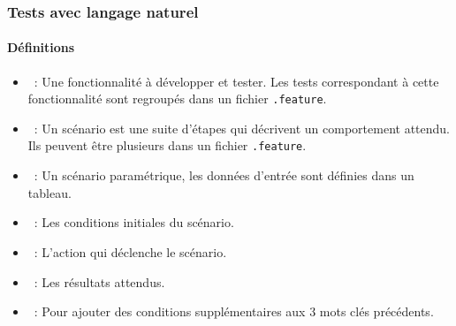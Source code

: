 \documentclass{beamer}
\begin{document}
    \begin{frame}
        \frametitle{Tests avec langage naturel}
        \framesubtitle{Définitions}
        \transdissolve
        \begin{itemize}
            \item {}~: Une fonctionnalité à développer et tester.
            Les tests correspondant à cette fonctionnalité sont regroupés dans un fichier \lstinline{.feature}.
            \item {}~: Un scénario est une suite d'étapes qui décrivent un comportement attendu.
            Ils peuvent être plusieurs dans un fichier \lstinline{.feature}.
            \item {}~: Un scénario paramétrique, les données d'entrée sont définies dans un tableau.
            \item {}~: Les conditions initiales du scénario.
            \item {}~: L'action qui déclenche le scénario.
            \item {}~: Les résultats attendus.
            \item {}~: Pour ajouter des conditions supplémentaires aux 3 mots clés précédents.
        \end{itemize}
    \end{frame}
\end{document}
